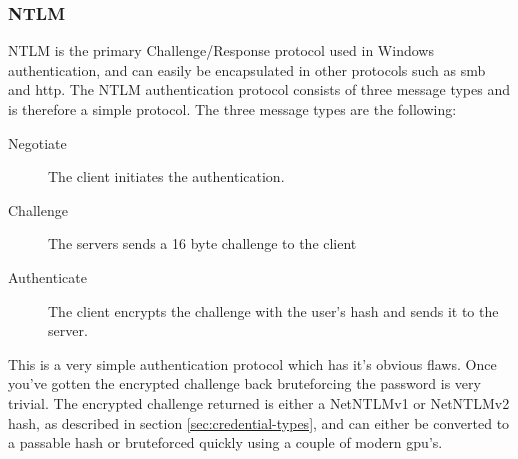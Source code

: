 \documentclass{article}
\begin{document}
\subsubsection{NTLM}
NTLM is the primary Challenge/Response protocol used in Windows authentication, and can easily be encapsulated in other protocols such as \gls{smb} and \gls{http}. The NTLM authentication protocol consists of three message types and is therefore a simple protocol\cite{url:microsoft:ntlm-message-syntax}. The three message types are the following:

\begin{description}
    \item[Negotiate] The client initiates the authentication.
    \item[Challenge] The servers sends a 16 byte challenge to the client
    \item[Authenticate] The client encrypts the challenge with the user's hash and sends it to the server.
\end{description}

This is a very simple authentication protocol which has it's obvious flaws. Once you've gotten the encrypted challenge back bruteforcing the password is very trivial. The encrypted challenge returned is either a NetNTLMv1 or NetNTLMv2 hash, as described in section \ref{sec:credential-types}, and can either be converted to a passable hash or bruteforced quickly using a couple of modern \gls{gpu}'s.
\end{document}
